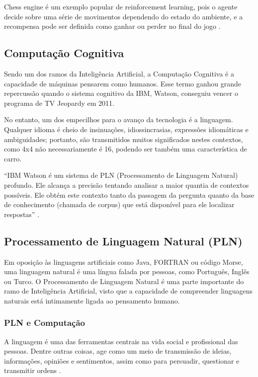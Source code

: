 \documentclass[
	12pt,				%
	openright,			%
	oneside,			%
	a4paper,			%
	english,			%
	spanish,			%
	brazil				%
	]{abntex2}
\begin{document}
		Chess engine é um exemplo popular de reinforcement learning, pois o agente decide sobre uma série de movimentos dependendo do estado do ambiente, e a recompensa pode ser definida como ganhar ou perder no final do jogo \cite{r_julian_heart}.  %
	
	
	\subsection{Computação Cognitiva}

	Sendo um dos ramos da Inteligência Artificial, a Computação Cognitiva é a capacidade de máquinas pensarem como humanos. Esse termo ganhou grande repercussão quando o sistema cognitivo da IBM, Watson, conseguiu vencer o programa de TV Jeopardy em 2011.

	No entanto, um dos empecilhos para o avanço da tecnologia é a linguagem. Qualquer idioma é cheio de insinuações, idiossincrasias, expressões idiomáticas e ambiguidades; portanto, são transmitidos muitos significados nestes contextos, como 4x4 não necessariamente é 16, podendo ser também uma característica de carro.

	``IBM Watson é um sistema de PLN (Processamento de Linguagem Natural) profundo. Ele alcança a precisão tentando analisar a maior quantia de contextos possíveis. Ele obtém este contexto tanto da passagem da pergunta quanto da base de conhecimento (chamada de corpus) que está disponível para ele localizar respostas'' \cite{watson_manual}. 

	\subsection{Processamento de Linguagem Natural (PLN)}
	Em oposição às linguagens artificiais como Java, FORTRAN ou código Morse, uma linguagem natural é uma língua falada por pessoas, como Português, Inglês ou Turco. O Processamento de Linguagem Natural é uma parte importante do ramo de Inteligência Artificial, visto que a capacidade de compreender linguagens naturais está intimamente ligada ao pensamento humano. %
	
		\subsubsection*{PLN e Computação}
		A linguagem é uma das ferramentas centrais na vida social e profissional das pessoas. Dentre outras coisas, age como um meio de transmissão de ideias, informações, opiniões e sentimentos, assim como para persuadir, questionar e transmitir ordens \cite{book_natural_lang}.
		
\end{document}
